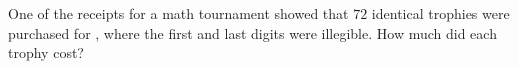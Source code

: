 One of the receipts for a math tournament showed that $72$ identical trophies were purchased for , where the first and last digits were illegible.  How much did each trophy cost?